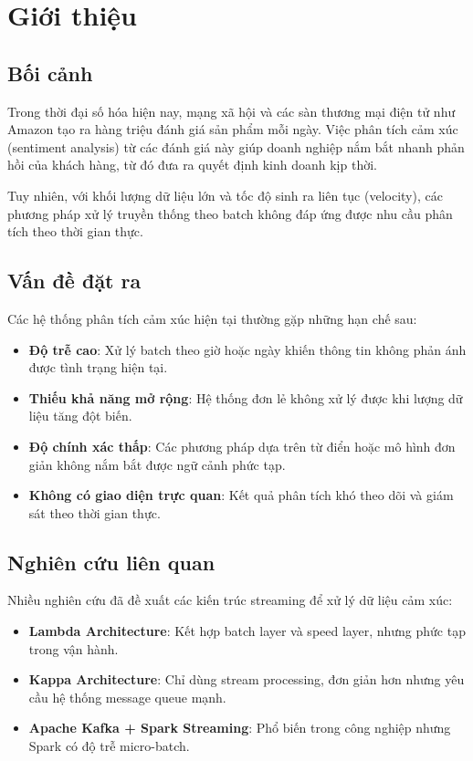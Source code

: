 \section{Giới thiệu}

\subsection{Bối cảnh}

Trong thời đại số hóa hiện nay, mạng xã hội và các sàn thương mại điện tử như Amazon tạo ra hàng triệu đánh giá sản phẩm mỗi ngày. Việc phân tích cảm xúc (sentiment analysis) từ các đánh giá này giúp doanh nghiệp nắm bắt nhanh phản hồi của khách hàng, từ đó đưa ra quyết định kinh doanh kịp thời.

Tuy nhiên, với khối lượng dữ liệu lớn và tốc độ sinh ra liên tục (velocity), các phương pháp xử lý truyền thống theo batch không đáp ứng được nhu cầu phân tích theo thời gian thực.

\subsection{Vấn đề đặt ra}

Các hệ thống phân tích cảm xúc hiện tại thường gặp những hạn chế sau:

\begin{itemize}
    \item \textbf{Độ trễ cao}: Xử lý batch theo giờ hoặc ngày khiến thông tin không phản ánh được tình trạng hiện tại.
    \item \textbf{Thiếu khả năng mở rộng}: Hệ thống đơn lẻ không xử lý được khi lượng dữ liệu tăng đột biến.
    \item \textbf{Độ chính xác thấp}: Các phương pháp dựa trên từ điển hoặc mô hình đơn giản không nắm bắt được ngữ cảnh phức tạp.
    \item \textbf{Không có giao diện trực quan}: Kết quả phân tích khó theo dõi và giám sát theo thời gian thực.
\end{itemize}

\subsection{Nghiên cứu liên quan}

Nhiều nghiên cứu đã đề xuất các kiến trúc streaming để xử lý dữ liệu cảm xúc:

\begin{itemize}
    \item \textbf{Lambda Architecture}: Kết hợp batch layer và speed layer, nhưng phức tạp trong vận hành.
    \item \textbf{Kappa Architecture}: Chỉ dùng stream processing, đơn giản hơn nhưng yêu cầu hệ thống message queue mạnh.
    \item \textbf{Apache Kafka + Spark Streaming}: Phổ biến trong công nghiệp nhưng Spark có độ trễ micro-batch.
\end{itemize}


